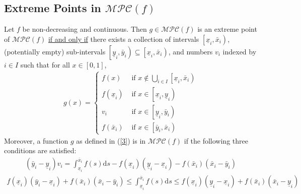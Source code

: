 \documentclass[11pt]{elegantbook}
\begin{document}
\subsection{Extreme Points in $\mathcal{MPC}(f)$}
\begin{theorem}
    Let $f$ be non-decreasing and continuous. Then $g \in \mathcal{MPC}(f)$ is an extreme point of $\mathcal{MPC}(f)$ \underline{if and only if} there exists a collection of intervals $\left[\underline{x}_i, \bar{x}_i\right)$, (potentially empty) sub-intervals $\left[\underline{y}_i, \bar{y}_i\right) \subseteq \left[\underline{x}_i, \bar{x}_i\right)$, and numbers $v_i$ indexed by $i \in I$ such that for all $x \in[0,1]$,
    \begin{equation}
        \begin{aligned}
            g(x)=
            \begin{cases}
                f(x) & \text { if } x \notin \bigcup_{i \in I}\left[\underline{x}_i, \bar{x}_i\right)\\
                f\left(\underline{x}_i\right) & \text { if } x \in\left[\underline{x}_i, \underline{y}_i\right)\\
                v_i & \text { if } x \in\left[\underline{y}_i, \bar{y}_i\right)\\
                f\left(\bar{x}_i\right) & \text { if } x \in\left[\bar{y}_i, \bar{x}_i\right)
            \end{cases}
        \end{aligned}
        \label{3}
    \end{equation}
    Moreover, a function $g$ as defined in (\ref{3}) is in $\mathcal{MPC}(f)$ if the following three conditions are satisfied:
    \begin{equation}
        \begin{aligned}
            \left(\bar{y}_i-\underline{y}_i\right) v_i=\int_{\underline{x}_i}^{\bar{x}_i} f(s) \mathrm{d} s-f\left(\underline{x}_i\right)\left(\underline{y}_i-\underline{x}_i\right)-f\left(\bar{x}_i\right)\left(\bar{x}_i-\bar{y}_i\right)
        \end{aligned}
        \label{4}
    \end{equation}
    \begin{equation}
        \begin{aligned}
            f\left(\underline{x}_i\right)\left(\bar{y}_i-\underline{x}_i\right)+f\left(\bar{x}_i\right)\left(\bar{x}_i-\bar{y}_i\right) \leq \int_{\underline{x}_i}^{\bar{x}_i} f(s) \mathrm{d} s \leq f\left(\underline{x}_i\right)\left(\underline{y}_i-\underline{x}_i\right)+f\left(\bar{x}_i\right)\left(\bar{x}_i-\underline{y}_i\right)

\end{aligned}
\end{equation}
\end{theorem}
\end{document}
